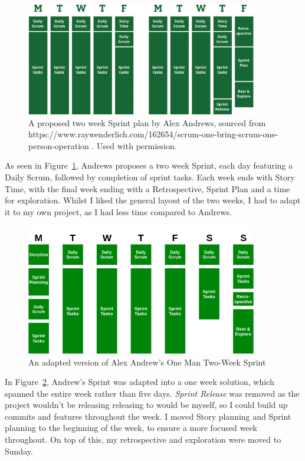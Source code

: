 \documentclass[a4paper,10pt]{report}
\begin{document}
\begin{figure}[h!]
    \centering
  \includegraphics[width=0.9\textwidth]{RayWenderlich}
 \caption{A proposed two week Sprint plan by Alex Andrews, sourced from https://www.raywenderlich.com/162654/scrum-one-bring-scrum-one-person-operation . Used with permission.}
 \label{fig:two_week_sprint_plan}
\end{figure}

As seen in Figure~\ref{fig:two_week_sprint_plan}, Andrews proposes a two week Sprint, each day featuring a Daily Scrum, followed by completion of sprint tasks. Each week ends with Story Time, with the final week ending with a Retrospective, Sprint Plan and a time for exploration. Whilst I liked the general layout of the two weeks, I had to adapt it to my own project, as I had less time compared to Andrews. \\

\begin{figure}[h!]
    \centering
  \includegraphics[width=0.9\textwidth]{Sprint_Plan}
 \caption{An adapted version of Alex Andrew's One Man Two-Week Sprint}
 \label{fig:one_week_sprint_plan}
\end{figure}

In Figure~\ref{fig:one_week_sprint_plan}, Andrew's Sprint was adapted into a one week solution, which spanned the entire week rather than five days. \textit{Sprint Release} was removed as the project wouldn't be releasing  releasing to would be myself, so I could build up commits and features throughout the week. I moved Story planning and Sprint planning to the beginning of the week, to ensure a more focused week throughout. On top of this, my retrospective and exploration were moved to Sunday. \\
\end{document}
